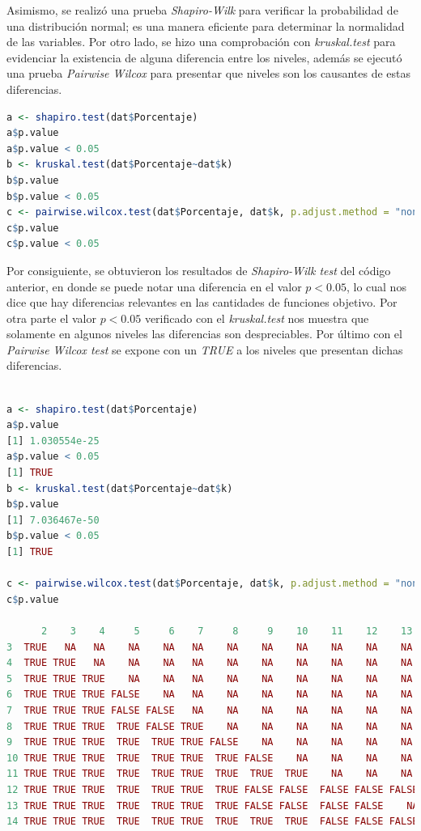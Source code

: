\documentclass[12pt, letterpaper] {article}
\begin{document}
Asimismo, se realizó una prueba \textit{Shapiro-Wilk} para verificar la probabilidad de una distribución normal; es una manera eficiente para determinar la normalidad de las variables. Por otro lado, se hizo una comprobación con \textit{kruskal.test} para evidenciar la existencia de alguna diferencia entre los niveles, además se ejecutó una prueba \textit{Pairwise Wilcox} para presentar que niveles son los causantes de estas diferencias.\\

\begin{lstlisting}[language=R]
a <- shapiro.test(dat$Porcentaje)
a$p.value
a$p.value < 0.05
b <- kruskal.test(dat$Porcentaje~dat$k)
b$p.value
b$p.value < 0.05
c <- pairwise.wilcox.test(dat$Porcentaje, dat$k, p.adjust.method = "none")
c$p.value
c$p.value < 0.05
\end{lstlisting}

Por consiguiente, se obtuvieron los resultados de \textit{Shapiro-Wilk test} del código anterior, en donde se puede notar una diferencia en el valor $p< 0.05$, lo cual nos dice que hay diferencias relevantes en las cantidades de funciones objetivo. Por otra parte el valor $p< 0.05$ verificado con el \textit{kruskal.test} nos muestra que solamente en algunos niveles las diferencias son despreciables. Por último con el \textit{Pairwise Wilcox test} se expone con un \textit{TRUE} a los niveles que presentan dichas diferencias.\\

\begin{lstlisting}[language=R]

a <- shapiro.test(dat$Porcentaje)
a$p.value
[1] 1.030554e-25
a$p.value < 0.05
[1] TRUE
b <- kruskal.test(dat$Porcentaje~dat$k)
b$p.value
[1] 7.036467e-50
b$p.value < 0.05
[1] TRUE

c <- pairwise.wilcox.test(dat$Porcentaje, dat$k, p.adjust.method = "none")
c$p.value  

      2    3    4     5     6    7     8     9    10    11    12    13 
3  TRUE   NA   NA    NA    NA   NA    NA    NA    NA    NA    NA    NA
4  TRUE TRUE   NA    NA    NA   NA    NA    NA    NA    NA    NA    NA
5  TRUE TRUE TRUE    NA    NA   NA    NA    NA    NA    NA    NA    NA
6  TRUE TRUE TRUE FALSE    NA   NA    NA    NA    NA    NA    NA    NA
7  TRUE TRUE TRUE FALSE FALSE   NA    NA    NA    NA    NA    NA    NA
8  TRUE TRUE TRUE  TRUE FALSE TRUE    NA    NA    NA    NA    NA    NA
9  TRUE TRUE TRUE  TRUE  TRUE TRUE FALSE    NA    NA    NA    NA    NA
10 TRUE TRUE TRUE  TRUE  TRUE TRUE  TRUE FALSE    NA    NA    NA    NA
11 TRUE TRUE TRUE  TRUE  TRUE TRUE  TRUE  TRUE  TRUE    NA    NA    NA
12 TRUE TRUE TRUE  TRUE  TRUE TRUE  TRUE FALSE FALSE  FALSE FALSE FALSE
13 TRUE TRUE TRUE  TRUE  TRUE TRUE  TRUE FALSE FALSE  FALSE FALSE    NA
14 TRUE TRUE TRUE  TRUE  TRUE TRUE  TRUE  TRUE  TRUE  FALSE FALSE FALSE

\end{lstlisting}
\end{document}
